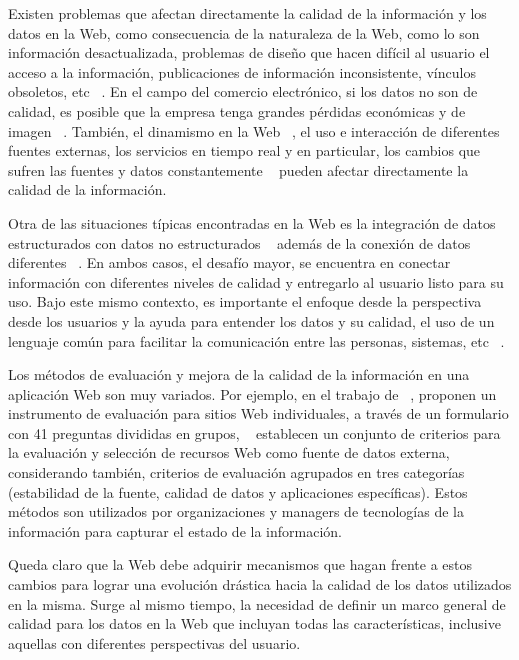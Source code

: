 Existen problemas que afectan directamente la calidad de la informaci\'on y los datos en la Web, como consecuencia de la naturaleza de la Web, como lo son informaci\'on desactualizada, problemas de dise\~no que hacen dif\'icil al usuario el acceso a la informaci\'on, publicaciones de informaci\'on inconsistente, v\'inculos obsoletos, etc ~\cite{EppMue:02}. En el campo del comercio electr\'onico, si los datos no son de calidad, es posible que la empresa tenga grandes p\'erdidas econ\'omicas y de imagen ~\cite{LimChi:00, HaiKor:03}.
Tambi\'en, el dinamismo en la Web ~\cite{Amir:03}, el uso e interacci\'on de diferentes fuentes externas, los servicios en tiempo real y en particular, los cambios que sufren las fuentes y datos constantemente ~\cite{PerbScam:02, Germ:04} pueden afectar directamente la calidad de la informaci\'on.

Otra de las situaciones t\'ipicas encontradas en la Web es la integraci\'on de datos estructurados con datos no estructurados ~\cite{FincAikp:99} adem\'as de la conexi\'on de datos diferentes ~\cite{ZhuBu:02, AngpMacl:04, BoumPerv:04, Germ:04}. En ambos casos, el desaf\'io mayor, se encuentra en conectar informaci\'on con diferentes niveles de calidad y entregarlo al usuario listo para su uso. Bajo este mismo contexto, es importante el enfoque desde la perspectiva desde los usuarios y la ayuda para entender los datos y su calidad, el uso de un lenguaje com\'un para facilitar la comunicaci\'on entre las personas, sistemas, etc ~\cite{AngpMacl:04, Cappc:04}.

Los m\'etodos de evaluaci\'on y mejora de la calidad de la informaci\'on en una aplicaci\'on Web son muy variados. Por ejemplo, en el trabajo de ~\cite{KatSia:99}, proponen un instrumento de evaluaci\'on para sitios Web individuales, a trav\'es de un formulario con 41 preguntas divididas en grupos, ~\cite{ZhuBu:02} establecen un conjunto de criterios para la evaluaci\'on y selecci\'on de recursos Web como fuente de datos externa, considerando tambi\'en, criterios de evaluaci\'on agrupados en tres categor\'ias (estabilidad de la fuente, calidad de datos y aplicaciones espec\'ificas). Estos m\'etodos son utilizados por organizaciones y managers de tecnolog\'ias de la informaci\'on para capturar el estado de la informaci\'on.

Queda claro que la Web debe adquirir mecanismos que hagan frente a estos cambios para lograr una evoluci\'on dr\'astica hacia la calidad de los datos utilizados en la misma. Surge al mismo tiempo, la necesidad de definir un marco general de calidad para los datos en la Web que incluyan todas las caracter\'isticas, inclusive aquellas con diferentes perspectivas del usuario.


